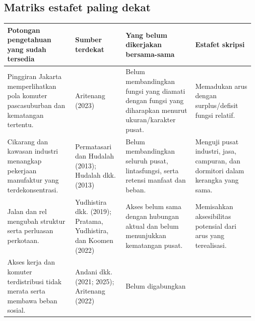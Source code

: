 \documentclass[
  indonesian,
  11pt,
  a4paper,
  oneside,
  openany]{report}
\newcounter{none} %
\begin{document}
\subsection{Matriks estafet paling
dekat}\label{matriks-estafet-paling-dekat}

{\def\LTcaptype{none} %
\begin{longtable}[]{@{}
  >{\raggedright\arraybackslash}p{}
  >{\raggedright\arraybackslash}p{}
  >{\raggedright\arraybackslash}p{}
  >{\raggedright\arraybackslash}p{}@{}}
\toprule\noalign{}
\begin{minipage}[b]{\linewidth}\raggedright
Potongan pengetahuan yang sudah tersedia
\end{minipage} & \begin{minipage}[b]{\linewidth}\raggedright
Sumber terdekat
\end{minipage} & \begin{minipage}[b]{\linewidth}\raggedright
Yang belum dikerjakan bersama-sama
\end{minipage} & \begin{minipage}[b]{\linewidth}\raggedright
Estafet skripsi
\end{minipage} \\
\midrule\noalign{}
\endhead
\bottomrule\noalign{}
\endlastfoot
Pinggiran Jakarta memperlihatkan pola komuter pascasuburban dan
kematangan tertentu. & Aritenang (2023) & Belum membandingkan fungsi
yang diamati dengan fungsi yang diharapkan menurut ukuran/karakter
pusat. & Memadukan arus dengan surplus/defisit fungsi relatif. \\
Cikarang dan kawasan industri menangkap pekerjaan manufaktur yang
terdekonsentrasi. & Permatasari dan Hudalah (2013); Hudalah dkk. (2013)
& Belum membandingkan seluruh pusat, lintasfungsi, serta retensi manfaat
dan beban. & Menguji pusat industri, jasa, campuran, dan dormitori dalam
kerangka yang sama. \\
Jalan dan rel mengubah struktur serta perluasan perkotaan. & Yudhistira
dkk. (2019); Pratama, Yudhistira, dan Koomen (2022) & Akses belum sama
dengan hubungan aktual dan belum menunjukkan kematangan pusat. &
Memisahkan aksesibilitas potensial dari arus yang terealisasi. \\
Akses kerja dan komuter terdistribusi tidak merata serta membawa beban
sosial. & Andani dkk. (2021; 2025); Aritenang (2022) & Belum digabungkan

\end{longtable}}
\end{document}

